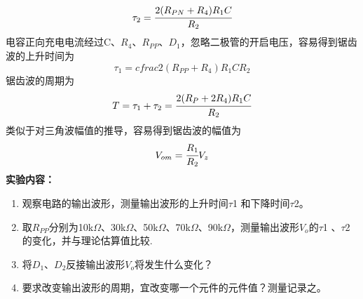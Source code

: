 \documentclass[a4paper]{article}
\begin{document}
\begin{equation}
\tau_2 = \cfrac{2(R_{PN}+R_4)R_1C}{R_2}\label{eq13}
\end{equation}
电容正向充电电流经过C、$R_4$、$R_{PP}$、$D_1$，忽略二极管的开启电压，容易得到锯齿波的上升时间为
\begin{equation}
\tau_1 = cfrac{2(R_{PP}+R_4)R_1C}{R_2}\label{eq14}
\end{equation}
锯齿波的周期为
\begin{equation}
T = \tau_1+\tau_2 = \cfrac{2(R_P+2R_4)R_1C}{R_2}\label{eq15}
\end{equation}
类似于对三角波幅值的推导，容易得到锯齿波的幅值为
\begin{equation}
V_{om} = \cfrac{R_1}{R_2}V_z\label{eq16}
\end{equation}
\textbf{实验内容：}
\begin{enumerate}
\item 观察电路的输出波形，测量输出波形的上升时间$\tau$1 和下降时间$\tau$2。
\item 取$R_{PP}$分别为10k$\Omega$、30k$\Omega$、50k$\Omega$、70k$\Omega$、90k$\Omega$，测量输出波形$V_o$的$\tau$1 、$\tau$2的变化，并与理论估算值比较.
\item 将$D_1$、$D_2$反接输出波形$V_o$将发生什么变化？
\item 要求改变输出波形的周期，宜改变哪一个元件的元件值？测量记录之。
\end{enumerate}
\end{document}
